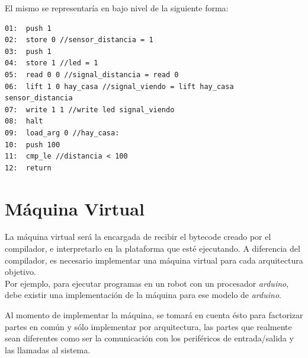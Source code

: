 El mismo se representaría en bajo nivel de la siguiente forma:

\begin{verbatim}
01:  push 1
02:  store 0 //sensor_distancia = 1
03:  push 1
04:  store 1 //led = 1
05:  read 0 0 //signal_distancia = read 0
06:  lift 1 0 hay_casa //signal_viendo = lift hay_casa sensor_distancia
07:  write 1 1 //write led signal_viendo
08:  halt
09:  load_arg 0 //hay_casa:
10:  push 100
11:  cmp_le //distancia < 100
12:  return
\end{verbatim}

\section{Máquina Virtual}

  La máquina virtual será la encargada de recibir el bytecode creado por
el compilador, e interpretarlo en la plataforma que esté ejecutando.
  A diferencia del compilador, es necesario implementar una máquina virtual
para cada arquitectura objetivo.\\

  Por ejemplo, para ejecutar programas en un robot
  con un procesador \emph{arduino}, debe
  existir una implementación de la máquina para ese modelo
  de \emph{arduino}.

  Al momento de implementar la máquina, se tomará en cuenta ésto para
  factorizar partes en común y sólo implementar por arquitectura, las
  partes que realmente sean diferentes como ser la comunicación con
  los periféricos de entrada/salida y las llamadas al sistema.

